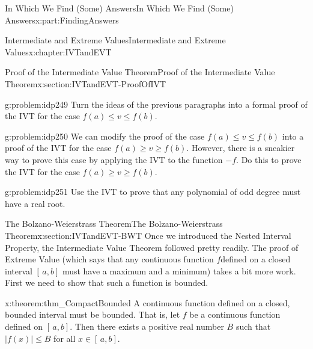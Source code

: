 \documentclass[oneside,10pt,]{book}
\numberwithin{equation}{section}
\begin{document}
\begin{partptx}{In Which We Find (Some) Answers}{}{In Which We Find (Some) Answers}{}{}{x:part:FindingAnswers}
\begin{chapterptx}{Intermediate and Extreme Values}{}{Intermediate and Extreme Values}{}{}{x:chapter:IVTandEVT}
\begin{sectionptx}{Proof of the Intermediate Value Theorem}{}{Proof of the Intermediate Value Theorem}{}{}{x:section:IVTandEVT-ProofOfIVT}
\begin{problem}{}{g:problem:idp249}%
 Turn the ideas of the previous paragraphs into a formal proof of the IVT for the case \(f(a)\leq v\leq f(b)\).%
\end{problem}
\begin{problem}{}{g:problem:idp250}%
 We can modify the proof of the case \(f(a)\leq v\leq f(b)\) into a proof of the IVT for the case \(f(a)\geq v\geq f(b)\). However, there is a sneakier way to prove this case by applying the IVT to the function \(-f\). Do this to prove the IVT for the case \(f(a)\geq v\geq f(b)\).%
\end{problem}
\begin{problem}{}{g:problem:idp251}%
 Use the IVT to prove that any polynomial of odd degree must have a real root.%
\end{problem}
\end{sectionptx}
%
%
\typeout{************************************************}
\typeout{************************************************}
%
\begin{sectionptx}{The Bolzano-Weierstrass Theorem}{}{The Bolzano-Weierstrass Theorem}{}{}{x:section:IVTandEVT-BWT}
Once we introduced the Nested Interval Property, the Intermediate Value Theorem followed pretty readily. The proof of Extreme Value (which says that any continuous function \(f\)defined on a closed interval \([\,a,b]\) must have a maximum and a minimum) takes a bit more work. First we need to show that such a function is bounded.%
\begin{theorem}{}{}{x:theorem:thm_CompactBounded}%
 A continuous function defined on a closed, bounded interval must be bounded.  That is, let \(f\) be a continuous function defined on \([\,a,b]\).  Then there exists a positive real number \(B\) such that \(|f(x)|\leq B\) for all \(x\in[\,a,b]\).%
\end{theorem}

\end{sectionptx}
\end{chapterptx}
\end{partptx}
\end{document}
